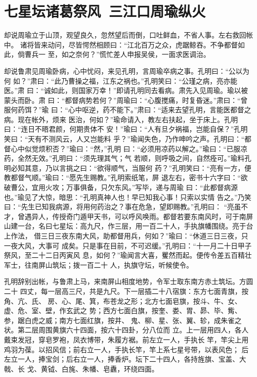 \chapter{七星坛诸葛祭风~三江口周瑜纵火}

却说周瑜立于山顶，观望良久，忽然望后而倒，口吐鲜血，不省人事。左右救回帐中。
诸将皆来动问，尽皆愕然相顾曰：“江北百万之众，虎踞鲸吞。不争都督如此，倘曹兵一
至，如之奈何？”慌忙差人申报吴侯，一面求医调治。

却说鲁肃见周瑜卧病，心中忧闷，来见孔明，言周瑜卒病之事。孔明曰：“公以为何
如？”肃曰：“此乃曹操之福，江东之祸也。”孔明笑曰：“公瑾之病，亮亦能医。”肃
曰：“诚如此，则国家万幸！”即请孔明同去看病。肃先入见周瑜。瑜以被蒙头而卧。肃
曰：“都督病势若何？”周瑜曰：“心腹搅痛，时复昏迷。”肃曰：“曾服何药饵？”瑜
曰：“心中呕逆，药不能下。”肃曰：“适来去望孔明，言能医都督之病。现在帐外，烦来
医治，何如？”瑜命请入，教左右扶起，坐于床上。孔明曰：“连日不晤君颜，何期贵体不
安！”瑜曰：“人有旦夕祸福，岂能自保？”孔明笑曰：“天有不测风云，人又岂能料
乎？”瑜闻失色，乃作呻吟之声。孔明曰：“都督心中似觉烦积否？”瑜曰：“然，”孔明
曰：“必须用凉药以解之。”瑜曰：“已服凉药，全然无效。”孔明曰：“须先理其气；气
若顺，则呼吸之间，自然痊可。”瑜料孔明必知其意，乃以言挑之曰：“欲得顺气，当服何
药？”孔明笑曰：“亮有一方，便教都督气顺。”瑜曰：“愿先生赐教。”孔明索纸笔，屏
退左右，密书十六字曰：“欲破曹公，宜用火攻；万事俱备，只欠东风。”写毕，递与周瑜
曰：“此都督病源也。”瑜见了大惊，暗思：“孔明真神人也！早已知我心事！只索以实情
告之。”乃笑曰：“先生已知我病源，将用何药治之？事在危急，望即赐教。”孔明曰：
“亮虽不才，曾遇异人，传授奇门遁甲天书，可以呼风唤雨。都督若要东南风时，可于南屏
山建一台，名曰七星坛：高九尺，作三层，用一百二十人，手执旗幡围绕。亮于台上作法，
借三日三夜东南大风，助都督用兵，何如？”瑜曰：“休道三日三夜，只一夜大风，大事可
成矣。只是事在目前，不可迟缓。”孔明曰：“十一月二十日甲子祭风，至二十二日丙寅风
息，如何？”瑜闻言大喜，矍然而起。便传令差五百精壮军士，往南屏山筑坛；拨一百二十
人，执旗守坛，听候使令。

孔明辞别出帐，与鲁肃上马，来南屏山相度地势，令军士取东南方赤土筑坛。方圆二十
四丈，每一层高三尺，共是九尺。下一层插二十八宿旗：东方七面青旗，按角、亢、氏、
房、心、尾、箕，布苍龙之形；北方七面皂旗，按斗、牛、女、虚、危、室、壁，作玄武之
势；西方七面白旗，按奎、娄、胃、昴、毕、觜、参，踞白虎之威；南方七面红旗，按井、
鬼、柳、星、张、翼、轸，成朱雀之状。第二层周围黄旗六十四面，按六十四卦，分八位而
立。上一层用四人，各人戴束发冠，穿皂罗袍，凤衣博带，朱履方裾。前左立一人，手执长
竿，竿尖上用鸡羽为葆。以招风信；前右立一人，手执长竿，竿上系七星号带，以表风色；
后左立一人，捧宝剑；后右立一人，捧香炉。坛下二十四人，各持旌旗、宝盖、大戟、长
戈、黄钺、白旄、朱幡、皂纛，环绕四面。

